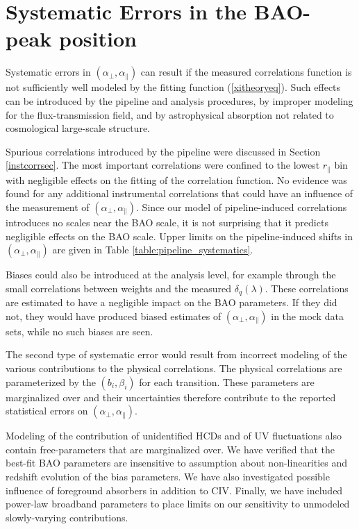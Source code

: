 \documentclass{aa}
\newcommand{\dqlam}{\delta_q(\lambda)}
\newcommand{\apar}{\alpha_\parallel}
\newcommand{\aperp}{\alpha_\perp}
\newcommand{\rpar}{r_\parallel}
\begin{document}
\section{Systematic Errors in the BAO-peak position}
\label{systsec}

Systematic errors in $(\aperp,\apar)$ can  
result if the measured correlations function
is not sufficiently well modeled by the fitting
function (\ref{xitheoryeq}).
Such effects can be introduced by the pipeline and
analysis procedures, by improper modeling for the flux-transmission
field, and by astrophysical absorption not related to cosmological
large-scale structure.

Spurious correlations
introduced by the pipeline
were discussed in 
Section \ref{instcorrsec}.  The most important correlations
were confined to the lowest $\rpar$ bin with negligible
effects on the fitting of the correlation function.
No evidence was found for any additional instrumental
correlations that could have an influence of the measurement
of  $(\aperp,\apar)$.
Since our model of pipeline-induced correlations introduces
no scales near the BAO scale, it is not surprising that
it predicts negligible effects on the BAO scale.
Upper limits on the pipeline-induced shifts
in $(\aperp,\apar)$ are  given
in Table \ref{table:pipeline_systematics}.

Biases could also be introduced at the analysis level, for example
through the small correlations between weights and the measured
$\dqlam$.
These correlations are estimated to have a negligible
impact on the BAO parameters.
If they did not, they would have produced biased estimates of $(\aperp,\apar)$
in the mock data sets, while no such biases are seen.


The second type of systematic error  would result from
incorrect modeling of the various contributions to the
physical correlations.
The physical correlations are parameterized by the $(b_i,\beta_i)$
for each transition.  These  parameters are marginalized over and
their uncertainties therefore contribute to the reported statistical
errors on $(\aperp,\apar)$.


Modeling of the contribution
of unidentified HCDs and of UV fluctuations also contain free-parameters
that are marginalized over.
We have verified that the best-fit BAO parameters are insensitive
to assumption about non-linearities and redshift evolution
of the bias parameters.
We have also investigated  possible influence of foreground
absorbers in addition to CIV.
Finally, we have included power-law broadband
parameters to place limits on our sensitivity to unmodeled
slowly-varying contributions.
\end{document}
